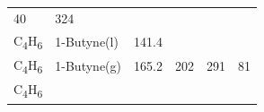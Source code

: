 \documentclass[
  9pt,
]{extbook}
\theoremstyle{definition}
\theoremstyle{definition}
\theoremstyle{definition}
\theoremstyle{remark}
\begin{document}
\begin{longtable}[]{@{}llllll@{}}
\begin{minipage}[t]{0.15\columnwidth}
40\strut
\end{minipage} & \begin{minipage}[t]{0.14\columnwidth}\raggedright
324\strut
\end{minipage} & \begin{minipage}[t]{0.14\columnwidth}\raggedright
\strut
\end{minipage}\tabularnewline
\begin{minipage}[t]{0.07\columnwidth}\raggedright
C\textsubscript{4}H\textsubscript{6}\strut
\end{minipage} & \begin{minipage}[t]{0.17\columnwidth}\raggedright
1-Butyne(l)\strut
\end{minipage} & \begin{minipage}[t]{0.15\columnwidth}\raggedright
141.4\strut
\end{minipage} & \begin{minipage}[t]{0.15\columnwidth}\raggedright
\strut
\end{minipage} & \begin{minipage}[t]{0.14\columnwidth}\raggedright
\strut
\end{minipage} & \begin{minipage}[t]{0.14\columnwidth}\raggedright
\strut
\end{minipage}\tabularnewline
\begin{minipage}[t]{0.07\columnwidth}\raggedright
C\textsubscript{4}H\textsubscript{6}\strut
\end{minipage} & \begin{minipage}[t]{0.17\columnwidth}\raggedright
1-Butyne(g)\strut
\end{minipage} & \begin{minipage}[t]{0.15\columnwidth}\raggedright
165.2\strut
\end{minipage} & \begin{minipage}[t]{0.15\columnwidth}\raggedright
202\strut
\end{minipage} & \begin{minipage}[t]{0.14\columnwidth}\raggedright
291\strut
\end{minipage} & \begin{minipage}[t]{0.14\columnwidth}\raggedright
81\strut
\end{minipage}\tabularnewline
\begin{minipage}[t]{0.07\columnwidth}\raggedright
C\textsubscript{4}H\textsubscript{6}\strut
\end{minipage} & \begin{minipage}[t]{0.17\columnwidth}\raggedright

\end{minipage}
\end{longtable}
\end{document}
